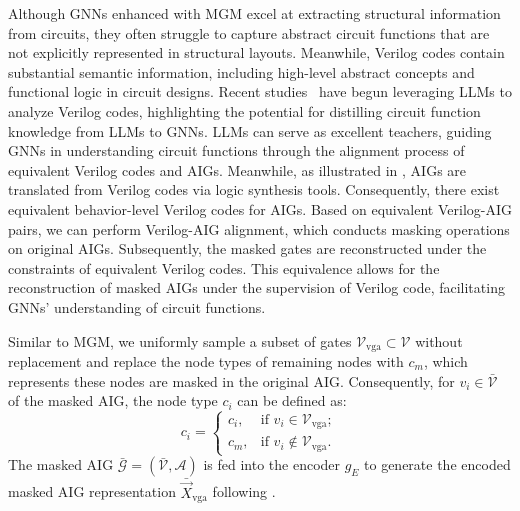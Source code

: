 Although GNNs enhanced with MGM excel at extracting structural information from circuits, they often struggle to capture abstract circuit functions that are not explicitly represented in structural layouts. 
Meanwhile, Verilog codes contain substantial semantic information, including high-level abstract concepts and functional logic in circuit designs.
Recent studies~\citep{lu2024rtllm, pei2024betterv} have begun leveraging LLMs to analyze Verilog codes, highlighting the potential for distilling circuit function knowledge from LLMs to GNNs. 
LLMs can serve as excellent teachers, guiding GNNs in understanding circuit functions through the alignment process of equivalent Verilog codes and AIGs.
Meanwhile, as illustrated in , AIGs are translated from Verilog codes via logic synthesis tools. 
Consequently, there exist equivalent behavior-level Verilog codes for AIGs.
Based on equivalent Verilog-AIG pairs, we can perform Verilog-AIG alignment, which conducts masking operations on original AIGs.
Subsequently, the masked gates are reconstructed under the constraints of equivalent Verilog codes. 
This equivalence allows for the reconstruction of masked AIGs under the supervision of Verilog code, facilitating GNNs' understanding of circuit functions.

Similar to MGM, we uniformly sample a subset of gates $\mathcal{V}_\text{vga} \subset \mathcal{V}$ without replacement and replace the node types of remaining nodes with $c_m$, which represents these nodes are masked in the original AIG.
Consequently, for $v_i \in \bar{\mathcal{V}}$ of the masked AIG, the node type $c_i$ can be defined as:
\begin{equation}
c_i = \begin{cases} 
    c_i, & \text{if } v_{i} \in \mathcal{V}_\text{vga}; \\
    c_m, & \text{if } v_{i} \notin \mathcal{V}_\text{vga}.
      \end{cases}
\end{equation}
The masked AIG $\bar{\mathcal{G}} = (\bar{\mathcal{V}}, \mathcal{A})$ is fed into the encoder $g_E$ to generate the encoded masked AIG representation $\bar{\Vec{X}}_\text{vga}$ following . 

